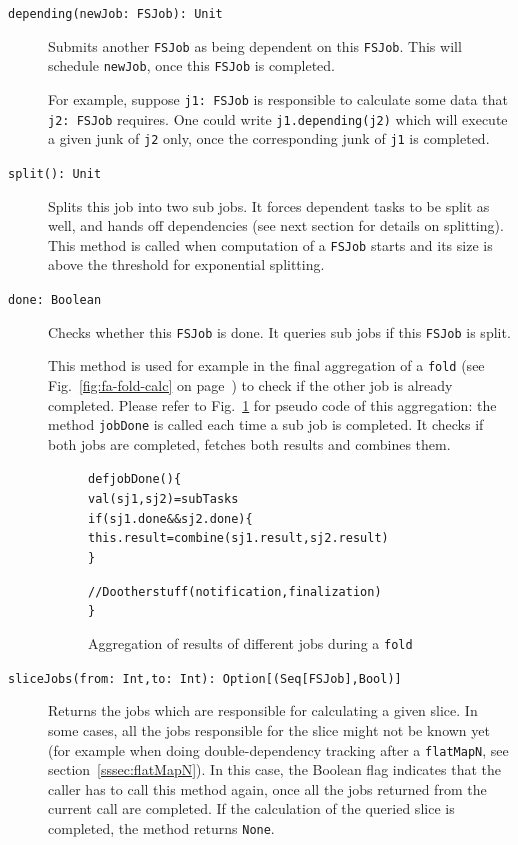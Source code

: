 \documentclass[runningheads,a4paper,fleqn]{llncs}
\begin{document}
\begin{description}
  \item[\texttt{depending(newJob: FSJob): Unit}] Submits another \texttt{FSJob} as being
    dependent on this \texttt{FSJob}. This will schedule
    \texttt{newJob}, once this \texttt{FSJob} is completed.

    For example, suppose \texttt{j1: FSJob} is responsible to
    calculate some data that \texttt{j2: FSJob} requires. One
    could write \verb|j1.depending(j2)| which will execute a given
    junk of \texttt{j2} only, once the corresponding junk of
    \texttt{j1} is completed.
  \item[\texttt{split(): Unit}] Splits this job into two
    sub jobs. It forces dependent tasks to be split as well, and hands off
    dependencies (see next section for details on splitting). This
    method is called when computation of a \texttt{FSJob} starts and
    its size is above the threshold for exponential splitting.
  \item[\texttt{done: Boolean}] Checks whether this \texttt{FSJob} is
    done. It queries sub jobs if this \texttt{FSJob} is split.

    This method is used for example in the final aggregation of a 
    \texttt{fold} (see Fig.~\ref{fig:fa-fold-calc} on
    page~\pageref{fig:fa-fold-calc}) to check if the other job is
    already completed. Please refer to Fig.~\ref{fig:fa-fold-code} for
    pseudo code of this aggregation: the method \texttt{jobDone} is
    called each time a sub job is completed. It checks if both jobs
    are completed, fetches both results and combines them.

\begin{figure}    
\begin{alltt}
{\scriptsize
def jobDone() \{
  val (sj1, sj2) = subTasks
  if (sj1.done && sj2.done) \{
    this.result = combine(sj1.result, sj2.result)
  \}
  
  // Do other stuff (notification, finalization)
\}
}
\end{alltt}
\caption{Aggregation of results of different jobs during a
  \texttt{fold}}
\label{fig:fa-fold-code}
\end{figure}

  \item[\texttt{sliceJobs(from: Int,to: Int):
      Option[(Seq[FSJob],Bool)]}] Returns the jobs which are
    responsible for
    calculating a given slice. In some cases, all the jobs responsible 
    for the slice might not be known yet (for example when doing
    double-dependency tracking after a \texttt{flatMapN}, see
    section~\ref{sssec:flatMapN}). In this case, the Boolean flag
    indicates that the caller has to call this method again, once all
    the jobs returned from the current call are completed. If the
    calculation of the queried slice is completed, the method returns
    \texttt{None}.


\end{description}
\end{document}
